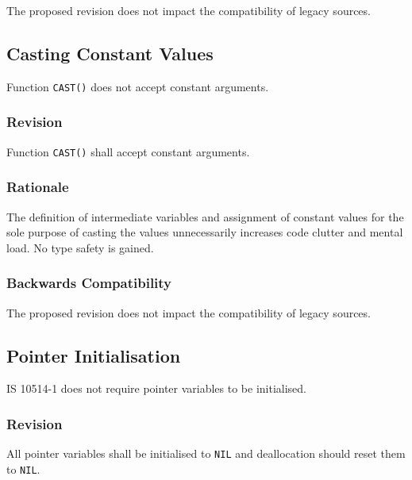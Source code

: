 \documentclass[10pt,a4paper,leqno,fleqn]{article}
\begin{document}
The proposed revision does not impact the compatibility of legacy sources.


\subsection{Casting Constant Values}

Function \verb|CAST()| does not accept constant arguments.

\subsubsection{Revision}

Function \verb|CAST()| shall accept constant arguments.

\subsubsection{Rationale}

The definition of intermediate variables and assignment of constant values
for the sole purpose of casting the values unnecessarily increases code clutter
and mental load. No type safety is gained.

\subsubsection{Backwards Compatibility}

The proposed revision does not impact the compatibility of legacy sources.


\subsection{Pointer Initialisation}

IS 10514-1 does not require pointer variables to be initialised.

\subsubsection{Revision}

All pointer variables shall be initialised to \verb|NIL| and deallocation
should reset them to \verb|NIL|.
\end{document}
